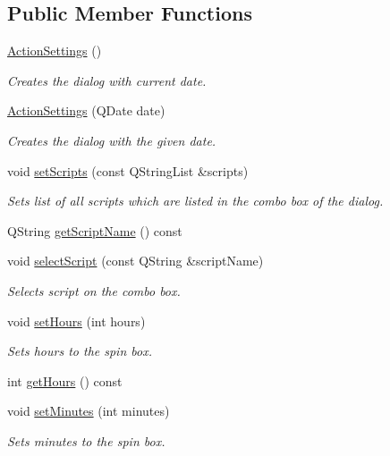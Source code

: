 \subsection*{Public Member Functions}
\begin{DoxyCompactItemize}
\item 
\hyperlink{class_action_settings_aca2bed5c8f16db7ce26e637f497e41cd}{Action\-Settings} ()
\begin{DoxyCompactList}\small\item\em Creates the dialog with current date. \end{DoxyCompactList}\item 
\hyperlink{class_action_settings_a3d09369db7e1a2642d73fb23926ada0c}{Action\-Settings} (Q\-Date date)
\begin{DoxyCompactList}\small\item\em Creates the dialog with the given date. \end{DoxyCompactList}\item 
void \hyperlink{class_action_settings_ad517be439f1db8afb3ca0cc06cf6c3ca}{set\-Scripts} (const Q\-String\-List \&scripts)
\begin{DoxyCompactList}\small\item\em Sets list of all scripts which are listed in the combo box of the dialog. \end{DoxyCompactList}\item 
Q\-String \hyperlink{class_action_settings_a14b9b342b2abb98cb27b8f642d895ee9}{get\-Script\-Name} () const 
\item 
void \hyperlink{class_action_settings_ad3335bd018c920476854c0e64a872d23}{select\-Script} (const Q\-String \&script\-Name)
\begin{DoxyCompactList}\small\item\em Selects script on the combo box. \end{DoxyCompactList}\item 
void \hyperlink{class_action_settings_afb0c8ddbe83ec2c52a84c226c46702f5}{set\-Hours} (int hours)
\begin{DoxyCompactList}\small\item\em Sets hours to the spin box. \end{DoxyCompactList}\item 
int \hyperlink{class_action_settings_ad1b4adb2da11d11e4d205051d4ad9a7c}{get\-Hours} () const 
\item 
void \hyperlink{class_action_settings_ae07a76fe6154e4c566dfa9e8456f7f0b}{set\-Minutes} (int minutes)
\begin{DoxyCompactList}\small\item\em Sets minutes to the spin box. \end{DoxyCompactList}\item 

\end{DoxyCompactItemize}
